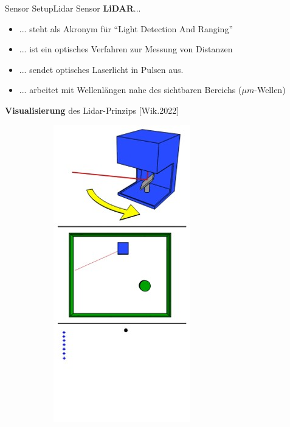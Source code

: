 \documentclass[169, handout	]{THIbeamer} %
\begin{document}
	\begin{frame}{Sensor Setup}{Lidar Sensor}
		\textbf{LiDAR}...		
		\begin{itemize}
			\item ... steht als Akronym für \enquote{Light Detection And Ranging}
			\item ... ist ein optisches Verfahren zur Messung von Distanzen
			\item ... sendet optisches Laserlicht in Pulsen aus. 
			\item ... arbeitet mit Wellenlängen nahe des sichtbaren Bereichs ($\mu m$-Wellen)
		\end{itemize}
		\textbf{Visualisierung} des Lidar-Prinzips [Wik.2022]
		\begin{figure}[htbp]
    		\centering
    		\begin{subfigure}[b]{0.15\textwidth}
        		\includegraphics[scale=0.2]{required/LiDAR-Sensor1.jpg}
        		\label{Lidar-t1}
   		 	\end{subfigure}
    		\begin{subfigure}[b]{0.15\textwidth}

\end{subfigure}
\end{figure}
\end{frame}
\end{document}
